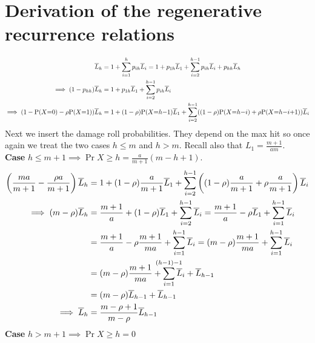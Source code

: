 \section{Derivation of the regenerative recurrence relations}\label{sect:regenRecurrenceDerivation}
\begin{align}
    \L_h
		&= 1 + \sum_{i=1}^{h} p_{ih}\L_i\nonumber
        = 1 + p_{1h}\L_1 + \sum_{i=2}^{h-1} p_{ih}\L_i + p_{hh}\L_h\nonumber\\
        \implies (1-p_{hh})\L_h
		&= 1 + p_{1h}\L_1 + \sum_{i=2}^{h-1} p_{ih}\L_i\nonumber\\
        \implies (1-\Pr{X=0} - \rho \Pr{X=1})\L_h
		&= 1 + (1-\rho)\Pr{X=h-1}\L_1
	+ \sum_{i=2}^{h-1}((1-\rho)\Pr{X=h-i} + \rho\Pr{X=h-i+1})\L_i\nonumber
\end{align}
Next we insert the damage roll probabilities. They depend on the max hit so once again we treat the two cases $h \leq m$ and $h>m$. Recall also that $L_1 = \frac{m+1}{am}$.\\
\textbf{Case} $h \leq m+1 \implies \Pr{X \geq h} = \frac{a}{m+1}(m-h+1)$.
\begin{align}
    \left(\frac{ma}{m+1} - \frac{\rho a}{m+1}\right)\L_h
	&= 1 + (1-\rho)\frac{a}{m+1}\L_1
	+ \sum_{i=2}^{h-1}\left((1-\rho)\frac{a}{m+1} + \rho\frac{a}{m+1}\right)\L_i\nonumber\\
    \implies (m - \rho)\L_h
	&= \frac{m+1}{a} + (1-\rho)\L_1 + \sum_{i=2}^{h-1} \L_i\nonumber
	= \frac{m+1}{a} - \rho\L_1 + \sum_{i=1}^{h-1} \L_i\nonumber\\
	&= \frac{m+1}{a} - \rho\frac{m+1}{ma} + \sum_{i=1}^{h-1} \L_i\nonumber
	= (m-\rho)\frac{m+1}{ma} + \sum_{i=1}^{h-1} \L_i\nonumber\\
	&= (m-\rho)\frac{m+1}{ma} + \sum_{i=1}^{\mathclap{(h-1)-1}} \L_i + \L_{h-1} \nonumber\\
    &= (m-\rho)\L_{h-1} + \L_{h-1} \nonumber\\
    \implies \L_h &= \frac{m-\rho+1}{m-\rho}\L_{h-1}
\end{align}
\textbf{Case} $h > m+1 \implies \Pr{X \geq h} = 0$
